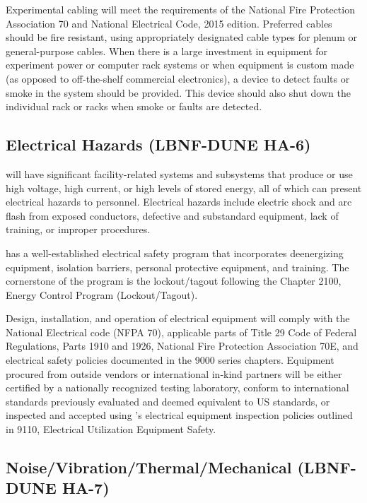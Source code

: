 Experimental cabling will meet the requirements of the National Fire
Protection Association 70 and National Electrical Code, 2015 edition.
Preferred cables should be fire resistant, using appropriately
designated cable types for plenum or general-purpose cables.  When
there is a large investment in equipment for experiment power or
computer rack systems or when equipment is custom made (as opposed to
off-the-shelf commercial electronics), a device to detect faults or
smoke in the system should be provided.  This device should also shut
down the individual rack or racks when smoke or faults are detected.


\subsection{Electrical Hazards (LBNF-DUNE HA-6)}

 will have significant facility-related
systems and subsystems that produce or use high voltage, high current,
or high levels of stored energy, all of which can present electrical
hazards to personnel. Electrical hazards include electric shock and
arc flash from exposed conductors, defective and substandard
equipment, lack of training, or improper procedures.

\fnal has a well-established electrical safety program that
incorporates deenergizing equipment, isolation barriers, personal
protective equipment, and training. The cornerstone of the program is
the lockout/tagout following the  Chapter 2100, \fnal
Energy Control Program (Lockout/Tagout).

Design, installation, and operation of electrical equipment will
comply with the National Electrical code (NFPA 70), applicable parts
of Title 29 Code of Federal Regulations, Parts 1910 and 1926, National
Fire Protection Association 70E, and \fnal electrical safety policies
documented in the  9000 series chapters. Equipment
procured from outside vendors or international in-kind partners will
be either certified by a nationally recognized testing laboratory,
conform to international standards previously evaluated and deemed
equivalent to US standards, or inspected and accepted using \fnal's
electrical equipment inspection policies outlined in 
9110, Electrical Utilization Equipment Safety.


\subsection{Noise/Vibration/Thermal/Mechanical (LBNF-DUNE HA-7)}


